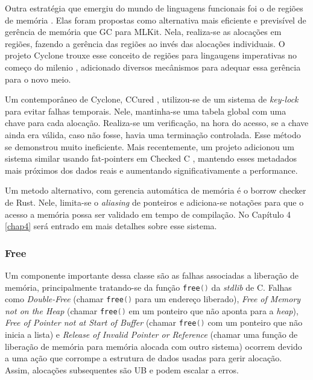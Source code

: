 \label{sec:mem-error:MemReg}
Outra estratégia que emergiu do mundo de linguagens funcionais foi o de regiões de memória \cite{REGMEM}. Elas foram propostas como alternativa mais eficiente e previsível de gerência de memória que GC para MLKit. Nela, realiza-se as alocações em regiões, fazendo a gerência das regiões ao invés das alocações individuais. O projeto Cyclone trouxe esse conceito de regiões para lingaugens imperativas no começo do milenio \cite{CYCLONEMEM}, adicionado diversos mecânismos para adequar essa gerência para o novo meio.

\label{sec:mem-error:KeyLock}
Um contemporâneo de Cyclone, CCured \cite{CCURED}, utilizou-se de um sistema de \emph{key-lock} para evitar falhas temporais. Nele, mantinha-se uma tabela global com uma chave para cada alocação. Realiza-se um verificação, na hora do acesso, se a chave ainda era válida, caso não fosse, havia uma terminação controlada. Esse método se demonstrou muito ineficiente. Mais recentemente, um projeto adicionou um sistema similar usando fat-pointers em Checked C \cite{FATPOINTERS}, mantendo esses metadados mais próximos dos dados reais e aumentando significativamente a performance.

\label{sec:mem-error:BorrowChecker}
Um metodo alternativo, com gerencia automática de memória é o borrow checker de Rust. Nele, limita-se o \emph{aliasing} de ponteiros e adiciona-se notações para que o acesso a memória possa ser validado em tempo de compilação. No Capítulo 4 \ref{chap4} será entrado em mais detalhes sobre esse sistema.

\subsubsection{Free}
\label{sec:mem-error:temporal:free}

\newcommand{\FREE}{\lstinline[language=C]|free()| }

Um componente importante dessa classe são as falhas associadas a liberação de memória, principalmente tratando-se da função \FREE da \emph{stdlib} de C. Falhas como \emph{Double-Free} (chamar \FREE para um endereço liberado), \emph{Free of Memory not on the Heap} (chamar \FREE em um ponteiro que não aponta para a \emph{heap}), \emph{Free of Pointer not at Start of Buffer} (chamar \FREE com um ponteiro que não inicia a lista) e \emph{Release of Invalid Pointer or Reference} (chamar uma função de liberação de memória para memória alocada com outro sistema) ocorrem devido a uma ação que corrompe a estrutura de dados usadas para gerir alocação. Assim, alocações subsequentes são UB e podem escalar a erros.

